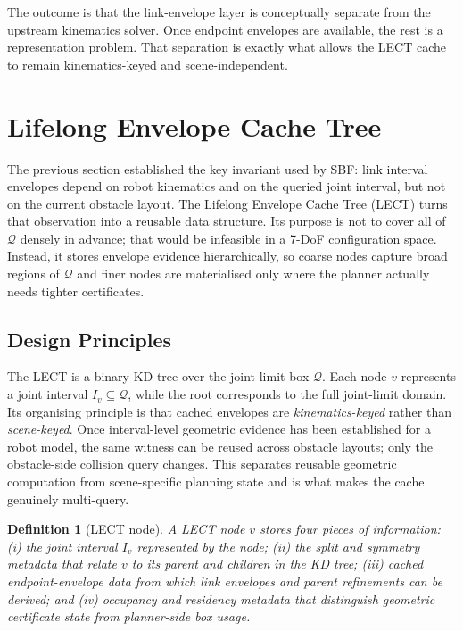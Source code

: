 \documentclass[journal]{IEEEtran}
\DeclareRobustCommand{\textsc}[1]{\textnormal{\MakeUppercase{#1}}}
\newtheorem{definition}{Definition}
\newcommand{\sbf}{\textsc{SBF}}
\newcommand{\Q}{\ensuremath{\mathcal{Q}}}
\begin{document}
The outcome is that the link-envelope layer is conceptually separate from the
upstream kinematics solver. Once endpoint envelopes are available, the rest is a
representation problem. That separation is exactly what allows the LECT cache to
remain kinematics-keyed and scene-independent.

\section{Lifelong Envelope Cache Tree}\label{sec:lect}

The previous section established the key invariant used by \sbf{}: link
interval envelopes depend on robot kinematics and on the queried joint interval,
but not on the current obstacle layout. The Lifelong Envelope Cache Tree
(LECT) turns that observation into a reusable data structure. Its purpose is
not to cover all of $\Q$ densely in advance; that would be infeasible in a
7-DoF configuration space. Instead, it stores envelope evidence hierarchically,
so coarse nodes capture broad regions of $\Q$ and finer nodes are materialised
only where the planner actually needs tighter certificates.

\subsection{Design Principles}\label{sec:lect_design}

The LECT is a binary KD tree over the joint-limit box $\Q$. Each node $v$
represents a joint interval $I_v \subseteq \Q$, while the root corresponds to
the full joint-limit domain. Its organising principle is that cached envelopes
are \emph{kinematics-keyed} rather than \emph{scene-keyed}. Once interval-level
geometric evidence has been established for a robot model, the same witness can
be reused across obstacle layouts; only the obstacle-side collision query
changes. This separates reusable geometric computation from scene-specific
planning state and is what makes the cache genuinely multi-query.

\begin{definition}[LECT node]
A LECT node $v$ stores four pieces of information: (i) the joint interval
$I_v$ represented by the node; (ii) the split and symmetry metadata that relate
$v$ to its parent and children in the KD tree; (iii) cached endpoint-envelope
data from which link envelopes and parent refinements can be derived; and
(iv) occupancy and residency metadata that distinguish geometric certificate
state from planner-side box usage.
\end{definition}
\end{document}

